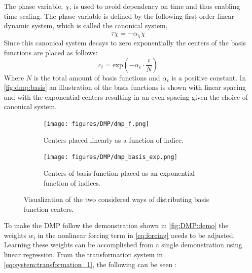 \documentclass[../main.tex]{subfiles}
\begin{document}
The phase variable, $\chi$, is used to avoid dependency on time and thus enabling time scaling. The phase variable is defined by the following first-order linear dynamic system, which is called the canonical system,
\begin{equation} \label{eq:system:canonical}
    \tau \dot{\chi} = -\alpha_\chi \chi
\end{equation}
Since this canonical system decays to zero exponentially the centers of the basis functions are placed as follows:
\begin{equation}
    c_i = \text{exp}\left(-\alpha_c \cdot \frac{i}{N}\right)
\end{equation}
Where $N$ is the total amount of basis functions and $\alpha_c$ is a positive constant. In \autoref{fig:dmp:basis} an illustration of the basis functions is shown with linear spacing and with the exponential centers resulting in an even spacing given the choice of canonical system.
\begin{figure}[H]
    \centering
    \begin{subfigure}[b]{0.48\textwidth}
        \centering
        \texttt{[image: figures/DMP/dmp\_f.png]}
        \caption{Centers placed linearly as a function of indice.}
        \label{fig:dmp:basis:lin}
    \end{subfigure}
    \hfill
    \begin{subfigure}[b]{0.48\textwidth}
        \centering
        \texttt{[image: figures/DMP/dmp\_basis\_exp.png]}
        \caption{Centers of basis function placed as an exponential function of indices.}
        \label{fig:dmp:basis:exp}
    \end{subfigure}
    \caption{Visualization of the two considered ways of distributing basis function centers.}
    \label{fig:dmp:basis}
\end{figure}
To make the DMP follow the demonstration shown in \autoref{fig:DMP:demo} the weights $w_i$ in the nonlinear forcing term in \autoref{eq:forcing} needs to be adjusted. Learning these weights can be accomplished from a single demonstration using linear regression.
From the transformation system in \autoref{eq:system:transformation_1}, the following can be seen \cite{ijspeert_dynamical_2013}:
\end{document}
